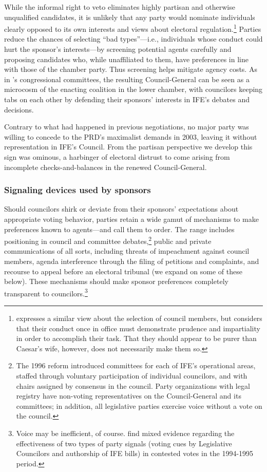\documentclass[12 pt, letter]{article}
\begin{document}
While the informal right to veto eliminates highly partisan and
otherwise unqualified candidates, it is unlikely that any party
would nominate individuals clearly opposed to its own interests and
views about electoral
regulation.\footnote{\citet{Schedler2000a}expresses a similar view
about the selection of council members, but considers that their
conduct once in office must demonstrate prudence and impartiality in
order to accomplish their task.  That they should appear to be purer
than Caesar's wife, however, does not necessarily make them so.}
Parties reduce the chances of selecting ``bad types''---i.e.,
individuals whose conduct could hurt the sponsor's interests---by
screening potential agents carefully and proposing candidates who,
while unaffiliated to them, have preferences in line with those of
the chamber party.  Thus screening helps mitigate agency costs.  As
in \citeauthor*{Cox1993}'s\citeyearpar{Cox1993} congressional
committees, the resulting Council-General can be seen as a microcosm
of the enacting coalition in the lower chamber, with councilors
keeping tabs on each other by defending their sponsors' interests in
IFE's debates and decisions.

Contrary to what had happened in previous negotiations, no major
party was willing to concede to the PRD's maximalist demands in
2003, leaving it without representation in IFE's Council.  From the
partisan perspective we develop this sign was ominous, a harbinger
of electoral distrust to come arising from incomplete
checks-and-balances in the renewed Council-General.

\subsubsection{Signaling devices used by sponsors}
Should councilors shirk or deviate from their sponsors' expectations
about appropriate voting behavior, parties retain a wide gamut of
mechanisms to make preferences known to agents---and call them to
order.  The range includes positioning in council and committee
debates,\footnote{The 1996 reform introduced committees for each of
IFE's operational areas, staffed through voluntary participation of
individual councilors, and with chairs assigned by consensus in the
council. Party organizations with legal registry have non-voting
representatives on the Council-General and its committees; in
addition, all legislative parties exercise voice without a vote on
the council.} public and private communications of all sorts,
including threats of impeachment against council members, agenda
interference through the filing of petitions and complaints, and
recourse to appeal before an electoral tribunal (we expand on some
of these below).  These mechanisms should make sponsor preferences
completely transparent to councilors.\footnote{Voice may be
inefficient, of course.  \citet{Malo1996} find mixed evidence
regarding the effectiveness of two types of party signals (voting
cues by Legislative Councilors and authorship of IFE bills) in
contested votes in the 1994-1995 period.}
\end{document}
